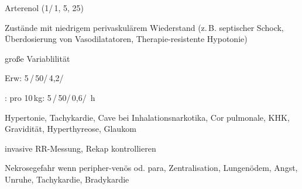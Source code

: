 
{
\begin{MedikamentCharakteristika}
  \item[{\TxItemSpezialitaeten}] Arterenol{\texttrademark} 
  (1\Ml*/\,1\Mg, 5\Ml, 25\Mg*)
  \item[{\TxItemIndikation}] Zustände mit niedrigem perivaskulärem 
  Wiederstand
  (z.\,B. septischer Schock, Überdosierung von Vasodilatatoren,
  Therapie-resistente Hypotonie)

  \item[{\TxItemDosierung}] gro{\ss}e Variablilität

  \Gam*

  Erw: 5\Mg\,/\,50\Ml*/\,4,2\Ml*/\Hour*

  : pro 10\,kg: 5\Mg\,/\,50\Ml*/\,0,6\Ml*/\,	h
 \item[{\TxItemKontraindikation}] Hypertonie, Tachykardie, Cave bei 
 Inhalationsnarkotika,
 Cor pulmonale, KHK, Gravidität, Hyperthyreose, Glaukom

 invasive RR-Messung, Rekap kontrollieren
 \item[NW] Nekrosegefahr wenn peripher-venös od. para,
 Zentralisation, Lungenödem, Angst, Unruhe, Tachykardie, Bradykardie
\end{MedikamentCharakteristika}}
{}
\begin{MedikamentCharakteristika}
  \item[{\TxItemSpezialitaeten}] 
  \item[{\TxItemBeschreibung}]
  \item[{\TxItemIndikation}]
  \item[{\TxItemKontraindikation}]
  \item[Präparate:]
\end{MedikamentCharakteristika}






\section{}

%


